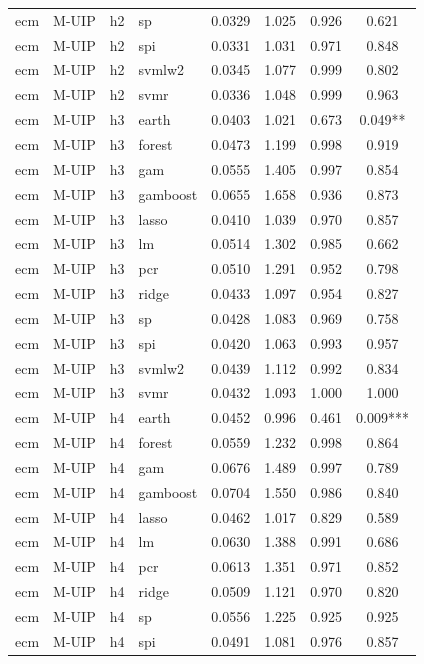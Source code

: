 \begin{ThreePartTable}
\begin{longtable}[t]{llclcccc}
ecm & M-UIP & h2 & sp & 0.0329 & 1.025 & 0.926 & 0.621\\
ecm & M-UIP & h2 & spi & 0.0331 & 1.031 & 0.971 & 0.848\\
ecm & M-UIP & h2 & svmlw2 & 0.0345 & 1.077 & 0.999 & 0.802\\
ecm & M-UIP & h2 & svmr & 0.0336 & 1.048 & 0.999 & 0.963\\
\addlinespace
ecm & M-UIP & h3 & earth & 0.0403 & 1.021 & 0.673 & 0.049**\\
ecm & M-UIP & h3 & forest & 0.0473 & 1.199 & 0.998 & 0.919\\
ecm & M-UIP & h3 & gam & 0.0555 & 1.405 & 0.997 & 0.854\\
ecm & M-UIP & h3 & gamboost & 0.0655 & 1.658 & 0.936 & 0.873\\
ecm & M-UIP & h3 & lasso & 0.0410 & 1.039 & 0.970 & 0.857\\
ecm & M-UIP & h3 & lm & 0.0514 & 1.302 & 0.985 & 0.662\\
ecm & M-UIP & h3 & pcr & 0.0510 & 1.291 & 0.952 & 0.798\\
ecm & M-UIP & h3 & ridge & 0.0433 & 1.097 & 0.954 & 0.827\\
ecm & M-UIP & h3 & sp & 0.0428 & 1.083 & 0.969 & 0.758\\
ecm & M-UIP & h3 & spi & 0.0420 & 1.063 & 0.993 & 0.957\\
ecm & M-UIP & h3 & svmlw2 & 0.0439 & 1.112 & 0.992 & 0.834\\
ecm & M-UIP & h3 & svmr & 0.0432 & 1.093 & 1.000 & 1.000\\
\addlinespace
ecm & M-UIP & h4 & earth & 0.0452 & 0.996 & 0.461 & 0.009***\\
ecm & M-UIP & h4 & forest & 0.0559 & 1.232 & 0.998 & 0.864\\
ecm & M-UIP & h4 & gam & 0.0676 & 1.489 & 0.997 & 0.789\\
ecm & M-UIP & h4 & gamboost & 0.0704 & 1.550 & 0.986 & 0.840\\
ecm & M-UIP & h4 & lasso & 0.0462 & 1.017 & 0.829 & 0.589\\
ecm & M-UIP & h4 & lm & 0.0630 & 1.388 & 0.991 & 0.686\\
ecm & M-UIP & h4 & pcr & 0.0613 & 1.351 & 0.971 & 0.852\\
ecm & M-UIP & h4 & ridge & 0.0509 & 1.121 & 0.970 & 0.820\\
ecm & M-UIP & h4 & sp & 0.0556 & 1.225 & 0.925 & 0.925\\
ecm & M-UIP & h4 & spi & 0.0491 & 1.081 & 0.976 & 0.857\\

\end{longtable}
\end{ThreePartTable}
